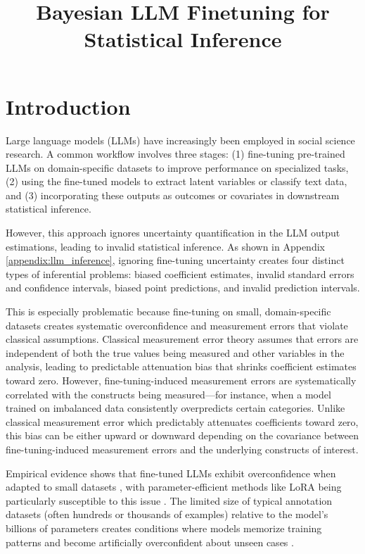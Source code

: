 \documentclass[11pt]{article}
\title{Bayesian LLM Finetuning for Statistical Inference}
\author{}
\date{}
\begin{document}
\maketitle
\vspace{-1in}

\section{Introduction}

Large language models (LLMs) have increasingly been employed in social science research.
A common workflow involves three stages:
(1) fine-tuning pre-trained LLMs on domain-specific datasets to improve performance on specialized tasks, 
(2) using the fine-tuned models to extract latent variables or classify text data, and 
(3) incorporating these outputs as outcomes or covariates in downstream statistical inference.

However, this approach ignores uncertainty quantification in the LLM output 
estimations, leading to invalid statistical inference. 
As shown in Appendix \ref{appendix:llm_inference}, 
ignoring fine-tuning uncertainty creates four distinct types of inferential problems: 
biased coefficient estimates, invalid standard errors and confidence intervals, 
biased point predictions, and invalid prediction intervals. 

This is especially problematic because fine-tuning on small, 
domain-specific datasets creates systematic overconfidence and measurement errors 
that violate classical assumptions. 
Classical measurement error theory assumes that errors are independent of both the true values being measured and other variables in the analysis, 
leading to predictable attenuation bias that shrinks coefficient estimates toward zero. 
However, fine-tuning-induced measurement errors are systematically correlated with the constructs being measured—for instance, 
when a model trained on imbalanced data consistently overpredicts certain categories. 
Unlike classical measurement error which predictably attenuates coefficients toward zero, 
this bias can be either upward or downward depending on the covariance between fine-tuning-induced measurement errors and the underlying constructs of interest.

Empirical evidence shows that fine-tuned LLMs exhibit overconfidence when adapted to small datasets \citep{kong2020calibrating, xiong2024llms}, 
with parameter-efficient methods like LoRA being particularly susceptible to this issue \citep{yang2023bayesian, wang2024blob}. 
The limited size of typical annotation datasets (often hundreds or thousands of examples) 
relative to the model's billions of parameters creates conditions where models memorize training patterns and
become artificially overconfident about unseen cases \citep{lin2022teaching}.
\end{document}
